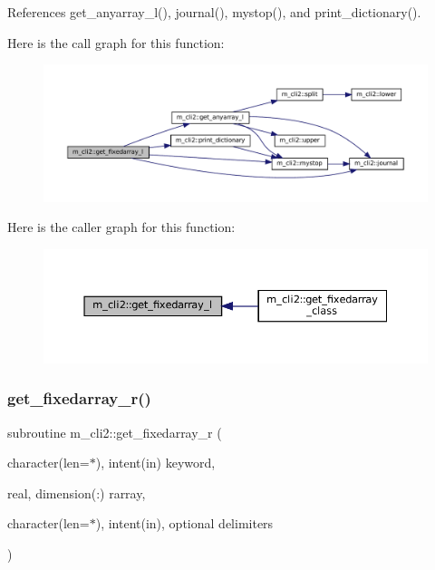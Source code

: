 References get\+\_\+anyarray\+\_\+l(), journal(), mystop(), and print\+\_\+dictionary().

Here is the call graph for this function\+:
\nopagebreak
\begin{figure}[H]
\begin{center}
\leavevmode
\includegraphics[width=350pt]{namespacem__cli2_a65ffe8c7a444db5db3be3f6edecef008_cgraph}
\end{center}
\end{figure}
Here is the caller graph for this function\+:\nopagebreak
\begin{figure}[H]
\begin{center}
\leavevmode
\includegraphics[width=350pt]{namespacem__cli2_a65ffe8c7a444db5db3be3f6edecef008_icgraph}
\end{center}
\end{figure}
\mbox{\label{namespacem__cli2_afbec790abad0dca990c0a61cd2d9e9ae}} 
\subsubsection{\texorpdfstring{get\+\_\+fixedarray\+\_\+r()}{get\_fixedarray\_r()}}
{\footnotesize\ttfamily subroutine m\+\_\+cli2\+::get\+\_\+fixedarray\+\_\+r (\begin{DoxyParamCaption}\item[{character(len=$\ast$), intent(in)}]{keyword,  }\item[{real, dimension(\+:)}]{rarray,  }\item[{character(len=$\ast$), intent(in), optional}]{delimiters }\end{DoxyParamCaption})\hspace{0.3cm}{\ttfamily [private]}}



